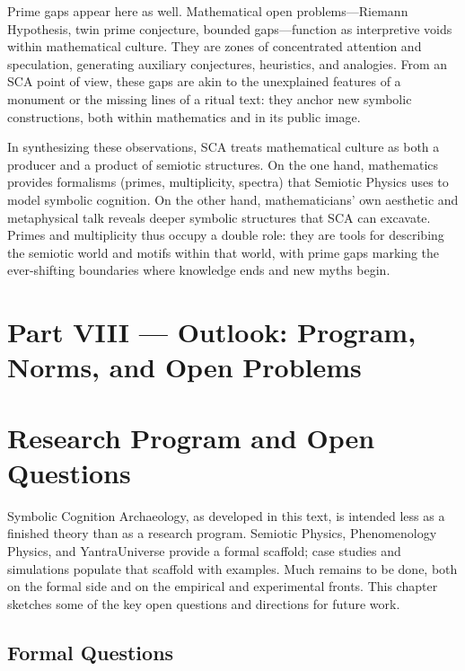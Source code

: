 \documentclass[12]{amsart}
\theoremstyle{plain}
\begin{document}
Prime gaps appear here as well. Mathematical open problems—Riemann Hypothesis, twin prime conjecture, bounded gaps—function as interpretive voids within mathematical culture. They are zones of concentrated attention and speculation, generating auxiliary conjectures, heuristics, and analogies. From an SCA point of view, these gaps are akin to the unexplained features of a monument or the missing lines of a ritual text: they anchor new symbolic constructions, both within mathematics and in its public image.

In synthesizing these observations, SCA treats mathematical culture as both a producer and a product of semiotic structures. On the one hand, mathematics provides formalisms (primes, multiplicity, spectra) that Semiotic Physics uses to model symbolic cognition. On the other hand, mathematicians' own aesthetic and metaphysical talk reveals deeper symbolic structures that SCA can excavate. Primes and multiplicity thus occupy a double role: they are tools for describing the semiotic world and motifs within that world, with prime gaps marking the ever-shifting boundaries where knowledge ends and new myths begin.


\section*{Part VIII — Outlook: Program, Norms, and Open Problems}

\section{Research Program and Open Questions}

Symbolic Cognition Archaeology, as developed in this text, is intended less as a finished theory than as a research program. Semiotic Physics, Phenomenology Physics, and YantraUniverse provide a formal scaffold; case studies and simulations populate that scaffold with examples. Much remains to be done, both on the formal side and on the empirical and experimental fronts. This chapter sketches some of the key open questions and directions for future work.

\subsection{Formal Questions}
\end{document}
